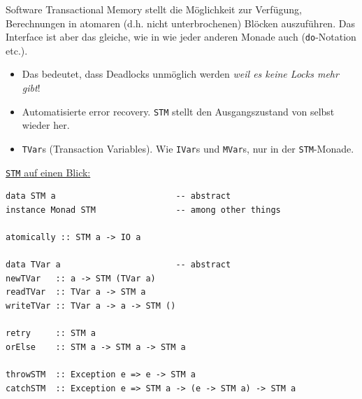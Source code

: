 \documentclass{beamer}
\begin{document}
\begin{frame}[fragile]

Software Transactional Memory stellt die Möglichkeit zur Verfügung, Berechnungen in atomaren (d.h. nicht unterbrochenen) Blöcken auszuführen. Das Interface ist aber das gleiche, wie in wie jeder anderen Monade auch (\texttt{do}-Notation etc.).\pause\bigskip

\begin{itemize}
\item Das bedeutet, dass Deadlocks unmöglich werden \emph{weil es keine Locks mehr gibt}!\pause
\item Automatisierte error recovery. \texttt{STM} stellt den Ausgangszustand von selbst wieder her.\pause
\item \texttt{TVar}s (Transaction Variables). Wie \texttt{IVar}s und \texttt{MVar}s, nur in der \texttt{STM}-Monade.
\end{itemize}

\end{frame}


\begin{frame}[fragile]

\underline{\texttt{STM} auf einen Blick:}\bigskip

\begin{verbatim}
data STM a                        -- abstract
instance Monad STM                -- among other things

atomically :: STM a -> IO a

data TVar a                       -- abstract
newTVar   :: a -> STM (TVar a)
readTVar  :: TVar a -> STM a
writeTVar :: TVar a -> a -> STM ()

retry     :: STM a
orElse    :: STM a -> STM a -> STM a

throwSTM  :: Exception e => e -> STM a
catchSTM  :: Exception e => STM a -> (e -> STM a) -> STM a
\end{verbatim}

\end{frame}

\end{document}
